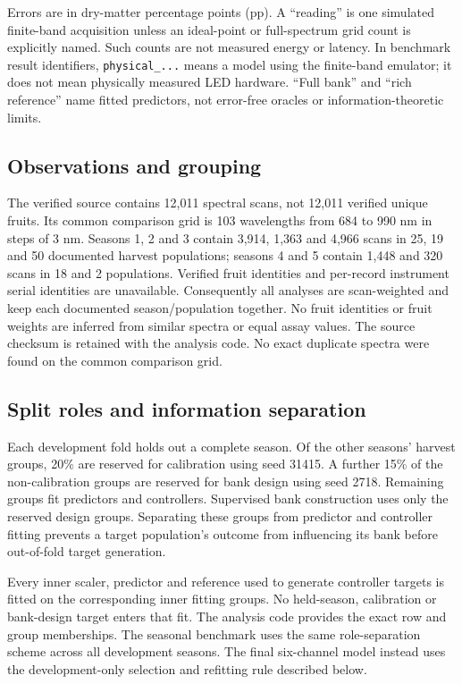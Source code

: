 \documentclass[10pt,a4paper]{article}
\begin{document}
Errors are in dry-matter percentage points (pp). A ``reading'' is one simulated finite-band acquisition unless an ideal-point or full-spectrum grid count is explicitly named. Such counts are not measured energy or latency. In benchmark result identifiers, \texttt{physical\_...} means a model using the finite-band emulator; it does not mean physically measured LED hardware. ``Full bank'' and ``rich reference'' name fitted predictors, not error-free oracles or information-theoretic limits.

\subsection{Observations and grouping}
The verified source contains 12,011 spectral scans, not 12,011 verified unique fruits. Its common comparison grid is 103 wavelengths from 684 to 990 nm in steps of 3 nm. Seasons 1, 2 and 3 contain 3,914, 1,363 and 4,966 scans in 25, 19 and 50 documented harvest populations; seasons 4 and 5 contain 1,448 and 320 scans in 18 and 2 populations. Verified fruit identities and per-record instrument serial identities are unavailable. Consequently all analyses are scan-weighted and keep each documented season/population together. No fruit identities or fruit weights are inferred from similar spectra or equal assay values. The source checksum is retained with the analysis code. No exact duplicate spectra were found on the common comparison grid.

\subsection{Split roles and information separation}
Each development fold holds out a complete season. Of the other seasons' harvest groups, 20\% are reserved for calibration using seed 31415. A further 15\% of the non-calibration groups are reserved for bank design using seed 2718. Remaining groups fit predictors and controllers. Supervised bank construction uses only the reserved design groups. Separating these groups from predictor and controller fitting prevents a target population's outcome from influencing its bank before out-of-fold target generation.

Every inner scaler, predictor and reference used to generate controller targets is fitted on the corresponding inner fitting groups. No held-season, calibration or bank-design target enters that fit. The analysis code provides the exact row and group memberships. The seasonal benchmark uses the same role-separation scheme across all development seasons. The final six-channel model instead uses the development-only selection and refitting rule described below.
\end{document}
